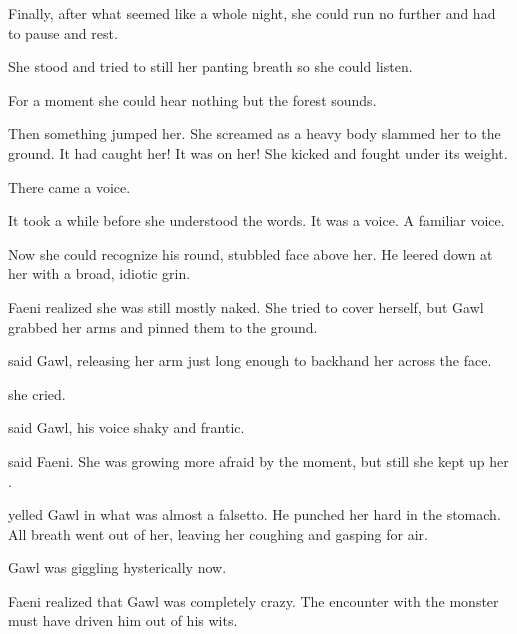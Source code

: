 Finally, after what seemed like a whole night, she could run no further and had to pause and rest. 

She stood and tried to still her panting breath so she could listen. 


For a moment she could hear nothing but the forest sounds. 

Then something jumped her. 
She screamed as a heavy body slammed her to the ground. 
It had caught her!
It was on her! 
She kicked and fought under its weight. 

There came a voice. 

It took a while before she understood the words. 
It was a \human voice. 
A familiar voice. 


Now she could recognize his round, stubbled face above her. 
He leered down at her with a broad, idiotic grin. 

Faeni realized she was still mostly naked. 
She tried to cover herself, but Gawl grabbed her arms and pinned them to the ground. 


 said Gawl, releasing her arm just long enough to backhand her across the face. 

 she cried. 

said Gawl, his voice shaky and frantic. 

 said Faeni.
She was growing more afraid by the moment, but still she kept up her \facade.

 yelled Gawl in what was almost a falsetto. 
He punched her hard in the stomach. 
All breath went out of her, leaving her coughing and gasping for air. 

Gawl was giggling hysterically now.

Faeni realized that Gawl was completely crazy. 
The encounter with the monster must have driven him out of his wits. 

